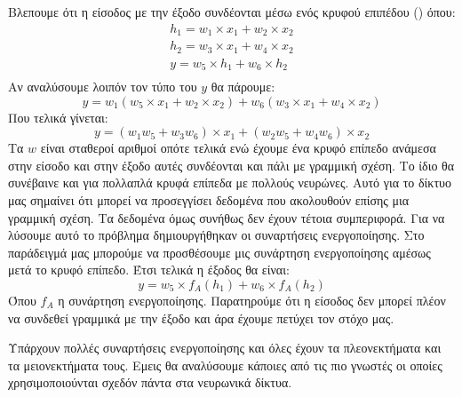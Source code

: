 
Βλεπουμε ότι η είσοδος με την έξοδο συνδέονται μέσω ενός κρυφού επιπέδου () όπου:
\begin{gather*}
    h_1=w_1\times x_1+w_2\times x_2 \\
    h_2=w_3\times x_1+w_4\times x_2 \\
    y=w_5\times h_1+w_6\times h_2 \\
\end{gather*}
Αν αναλύσουμε λοιπόν τον τύπο του $y$ θα πάρουμε:
$$y=w_1(w_5\times x_1+w_2\times x_2) + w_6(w_3\times x_1+w_4\times x_2)$$
Που τελικά γίνεται:
$$y=(w_1w_5+w_3w_6)\times x_1+(w_2w_5+w_4w_6)\times x_2$$
Τα $w$ είναι σταθεροί αριθμοί οπότε τελικά ενώ έχουμε ένα κρυφό επίπεδο ανάμεσα στην είσοδο και στην έξοδο αυτές συνδέονται και πάλι με γραμμική σχέση. Το ίδιο θα συνέβαινε και για πολλαπλά κρυφά επίπεδα με πολλούς νευρώνες. Αυτό για το
δίκτυο μας σημαίνει ότι μπορεί να προσεγγίσει δεδομένα που ακολουθούν επίσης μια γραμμική σχέση. Τα δεδομένα όμως συνήθως δεν έχουν τέτοια συμπεριφορά. Για να λύσουμε αυτό το πρόβλημα δημιουργήθηκαν οι συναρτήσεις ενεργοποίησης. Στο
παράδειγμά μας μπορούμε να προσθέσουμε μις συνάρτηση ενεργοποίησης αμέσως μετά το κρυφό επίπεδο. Έτσι τελικά η έξοδος θα είναι:
$$y=w_5\times f_A(h_1)+w_6\times f_A(h_2)$$
Όπου $f_A$ η συνάρτηση ενεργοποίησης. Παρατηρούμε ότι η είσοδος δεν μπορεί πλέον να συνδεθεί γραμμικά με την έξοδο και άρα έχουμε πετύχει τον στόχο μας.

Υπάρχουν πολλές συναρτήσεις ενεργοποίησης και όλες έχουν τα πλεονεκτήματα και τα μειονεκτήματα τους. Εμεις θα αναλύσουμε κάποιες από τις πιο γνωστές οι οποίες χρησιμοποιούνται σχεδόν πάντα στα νευρωνικά δίκτυα.

